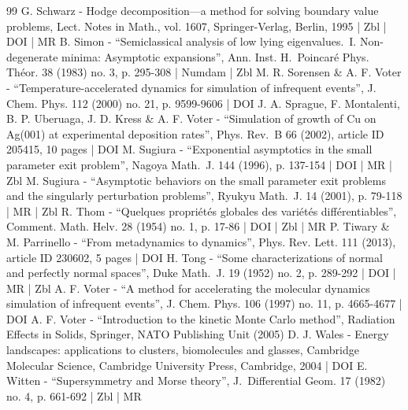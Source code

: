 \documentclass[10pt]{amsart}
\theoremstyle{plain}
\theoremstyle{definition}
\begin{document}
\begin{thebibliography}{99}
G. Schwarz - Hodge decomposition—a method for solving boundary value problems, Lect. Notes in Math., vol. 1607, Springer-Verlag, Berlin, 1995 | Zbl | DOI | MR
B. Simon - “Semiclassical analysis of low lying eigenvalues. I. Non-degenerate minima: Asymptotic expansions”, Ann. Inst. H. Poincaré Phys. Théor. 38 (1983) no. 3, p. 295-308 | Numdam | Zbl
M. R. Sorensen \& A. F. Voter - “Temperature-accelerated dynamics for simulation of infrequent events”, J. Chem. Phys. 112 (2000) no. 21, p. 9599-9606 | DOI
J. A. Sprague, F. Montalenti, B. P. Uberuaga, J. D. Kress \& A. F. Voter - “Simulation of growth of Cu on Ag(001) at experimental deposition rates”, Phys. Rev. B 66 (2002), article ID 205415, 10 pages | DOI
M. Sugiura - “Exponential asymptotics in the small parameter exit problem”, Nagoya Math. J. 144 (1996), p. 137-154 | DOI | MR | Zbl
M. Sugiura - “Asymptotic behaviors on the small parameter exit problems and the singularly perturbation problems”, Ryukyu Math. J. 14 (2001), p. 79-118 | MR | Zbl
R. Thom - “Quelques propriétés globales des variétés différentiables”, Comment. Math. Helv. 28 (1954) no. 1, p. 17-86 | DOI | Zbl | MR
P. Tiwary \& M. Parrinello - “From metadynamics to dynamics”, Phys. Rev. Lett. 111 (2013), article ID 230602, 5 pages | DOI
H. Tong - “Some characterizations of normal and perfectly normal spaces”, Duke Math. J. 19 (1952) no. 2, p. 289-292 | DOI | MR | Zbl
A. F. Voter - “A method for accelerating the molecular dynamics simulation of infrequent events”, J. Chem. Phys. 106 (1997) no. 11, p. 4665-4677 | DOI
A. F. Voter - “Introduction to the kinetic Monte Carlo method”, Radiation Effects in Solids, Springer, NATO Publishing Unit (2005)
D. J. Wales - Energy landscapes: applications to clusters, biomolecules and glasses, Cambridge Molecular Science, Cambridge University Press, Cambridge, 2004 | DOI
E. Witten - “Supersymmetry and Morse theory”, J. Differential Geom. 17 (1982) no. 4, p. 661-692 | Zbl | MR
\end{thebibliography}
\end{document}
